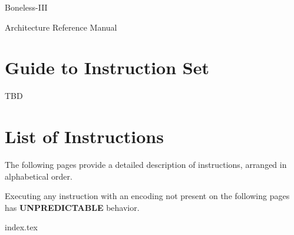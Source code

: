 \documentclass[12pt,a4paper]{article}
\newcommand{\unpredictable}{\textbf{UNPREDICTABLE}}
\begin{document}
\begin{titlepage}
  \centering
  \vspace*{6cm}
  \par{\Huge Boneless-III}
  \vspace{1cm}
  \par{\Huge Architecture Reference Manual}
\end{titlepage}

\tableofcontents
{}
\pagebreak

\setcounter{tocdepth}{2}

\section{Guide to Instruction Set}
TBD
\pagebreak

\section{List of Instructions}

The following pages provide a detailed description of instructions, arranged in alphabetical order.

Executing any instruction with an encoding not present on the following pages has \unpredictable{} behavior.
\pagebreak

{index.tex}
\end{document}
